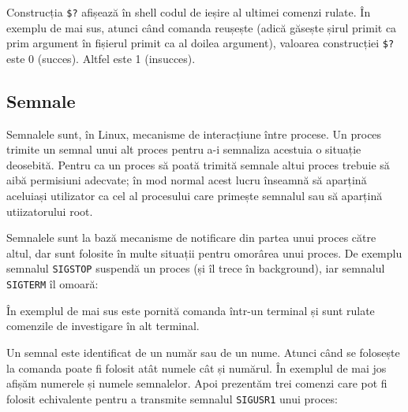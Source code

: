 Construcția \texttt{\$?} afișează în shell codul de ieșire al ultimei comenzi rulate. În exemplu de mai sus, atunci când comanda  reușește (adică găsește șirul primit ca prim argument în fișierul primit ca al doilea argument), valoarea construcției \texttt{\$?} este 0 (succes). Altfel este 1 (insucces).

\subsection{Semnale}
\label{sec:procese-operatii-semnale}

Semnalele sunt, în Linux, mecanisme de interacțiune între procese. Un proces
trimite un semnal unui alt proces pentru a-i semnaliza acestuia o situație
deosebită. Pentru ca un proces să poată trimită semnale altui proces trebuie să
aibă permisiuni adecvate; în mod normal acest lucru înseamnă să aparțină
aceluiași utilizator ca cel al procesului care primește semnalul sau să aparțină
utiizatorului root.

Semnalele sunt la bază mecanisme de notificare din partea unui proces către
altul, dar sunt folosite în multe situații pentru omorârea unui proces. De
exemplu semnalul \texttt{SIGSTOP} suspendă un proces (și îl trece în background), iar
semnalul \texttt{SIGTERM} îl omoară:


În exemplul de mai sus este pornită comanda  într-un terminal și sunt rulate comenzile de investigare în alt terminal.

Un semnal este identificat de un număr sau de un nume. Atunci când se folosește
la comanda  poate fi folosit atât numele cât și numărul. În exemplul de mai jos afișăm numerele și numele semnalelor. Apoi prezentăm trei comenzi care pot fi folosit echivalente pentru a transmite semnalul \texttt{SIGUSR1} unui proces:


